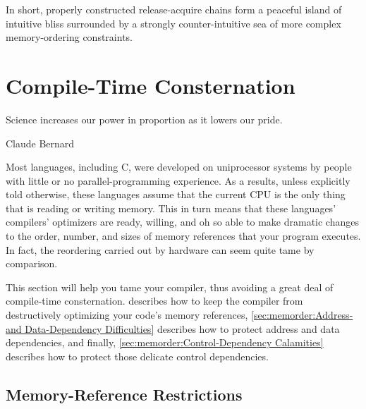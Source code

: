 \QuickQuizEnd

In short, properly constructed release-acquire chains form a peaceful
island of intuitive bliss surrounded by a strongly counter-intuitive
sea of more complex memory-ordering constraints.


\FloatBarrier

\section{Compile-Time Consternation}
\label{sec:memorder:Compile-Time Consternation}
%
\epigraph{Science increases our power in proportion as it lowers our pride.}
	 {Claude Bernard}

Most languages, including C, were developed on uniprocessor systems
by people with little or no parallel-programming experience.
As a results, unless explicitly told otherwise, these languages assume
that the current CPU is the only thing that is reading or writing memory.
This in turn means that these languages' compilers' optimizers
are ready, willing, and oh so able to make dramatic changes to the
order, number, and sizes of memory references that your program
executes.
In fact, the reordering carried out by hardware can seem quite tame
by comparison.

This section will help you tame your compiler, thus avoiding a great
deal of compile-time consternation.
describes how to keep the compiler from destructively optimizing
your code's memory references,
\cref{sec:memorder:Address- and Data-Dependency Difficulties}
describes how to protect address and data dependencies,
and finally,
\cref{sec:memorder:Control-Dependency Calamities}
describes how to protect those delicate control dependencies.

\subsection{Memory-Reference Restrictions}
\label{sec:memorder:Memory-Reference Restrictions}

